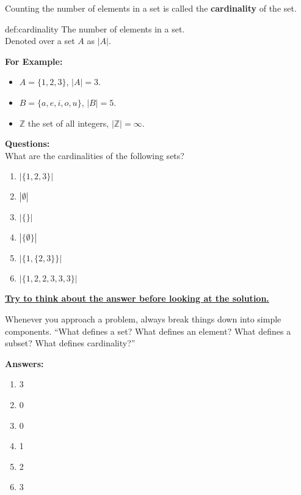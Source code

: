 \noindent
Counting the number of elements in a set is called the \textbf{cardinality} of the set.
\begin{Def}[Cardinality]{def:cardinality}
    The number of elements in a set.\\
    Denoted over a set $A$ as $|A|$.
\end{Def}

\noindent
\textbf{For Example:}
\begin{itemize}
    \item $A = \{1, 2, 3\}$, $|A| = 3$.
    \item $B = \{a, e, i, o, u\}$, $|B| = 5$.
    \item $\mathbb{Z}$ the set of all integers, $|\mathbb{Z}| = \infty$.
\end{itemize}

\noindent
\textbf{Questions:}\\
What are the cardinalities of the following sets?
\begin{enumerate}
    \item $|\{1,2,3\}|$
    \item $|\emptyset|$
    \item $|\{\}|$
    \item $|\{\emptyset\}|$
    \item $|\{1,\{2,3\}\}|$
    \item $|\{1,2,2,3,3,3\}|$
\end{enumerate}

\vspace{1em}

\noindent
\underline{\textbf{Try to think about the answer before looking at the solution.}}\\

\begin{Tip}
    Whenever you approach a problem, always break things down into simple components.
    ``What defines a set? What defines an element? What defines a subset? What defines cardinality?''\\
\end{Tip}

\noindent
\textbf{Answers:}
\begin{enumerate}
    \item 3
    \item 0
    \item 0
    \item 1
    \item 2
    \item 3
\end{enumerate}

